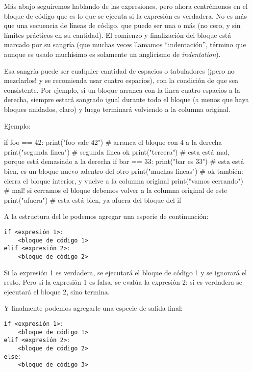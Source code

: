 Más abajo seguiremos hablando de las expresiones, pero ahora centrémonos en el bloque de código que es lo que se ejecuta si la expresión es verdadera. No es más que una secuencia de líneas de código, que puede ser una o más (no cero, y sin límites prácticos en su cantidad). El comienzo y finalización del bloque está marcado por su sangría (que muchas veces llamamos ``indentación'', término que aunque es usado muchísimo es solamente un anglicismo de \textit{indentation}).

Esa sangría puede ser cualquier cantidad de espacios o tabuladores (¡pero no mezclarlos! y se recomienda usar cuatro espacios), con la condición de que sea consistente. Por ejemplo, si un bloque arranca con la linea cuatro espacios a la derecha, siempre estará sangrado igual durante todo el bloque (a menos que haya bloques anidados, claro) y luego terminará volviendo a la columna original.

Ejemplo:

\begin{py}
if foo == 42:
    print("foo vale 42")  # arranca el bloque con 4 a la derecha
    print("segunda linea")  # segunda linea ok
      print("tercera")  # esta está mal, porque está demasiado a la derecha
    if bar == 33:
        print("bar es 33")  # esta está bien, es un bloque nuevo adentro del otro
    print("muchas líneas")  # ok también: cierra el bloque interior, y vuelve a la columna original
  print("vamos cerrando")  # mal! si cerramos el bloque debemos volver a la columna original de este
print("afuera")  # esta está bien, ya afuera del bloque del if
\end{py}

A la estructura del  le podemos agregar una especie de continuación:

\begin{verbatim}
if <expresión 1>:
    <bloque de código 1>
elif <expresión 2>:
    <bloque de código 2>
\end{verbatim}

Si la expresión 1 es verdadera, se ejecutará el bloque de código 1 y se ignorará el resto. Pero si la expresión 1 es falsa, se evalúa la expresión 2: si es verdadera se ejecutará el bloque 2, sino termina.

Y finalmente podemos agregarle una especie de salida final:

\begin{verbatim}
if <expresión 1>:
    <bloque de código 1>
elif <expresión 2>:
    <bloque de código 2>
else:
    <bloque de código 3>
\end{verbatim}

